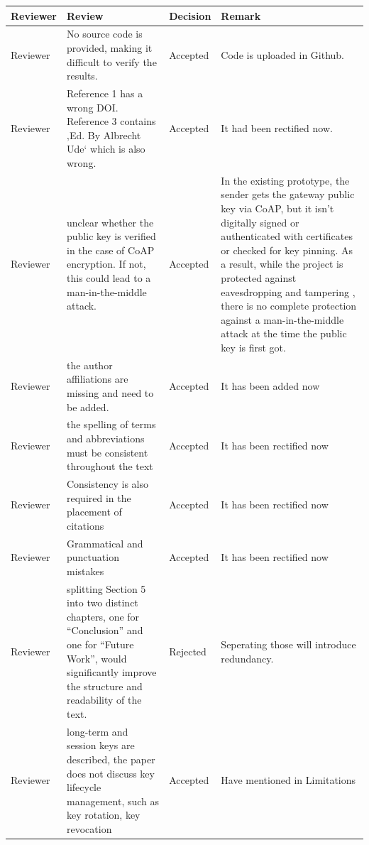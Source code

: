 \documentclass[a4paper]{scrartcl}
\begin{document}
  \begin{table}[H]
\centering
\begin{tabular}{|p{2cm}|p{5cm}|p{2cm}|p{5cm}|}
\hline
\textbf{Reviewer} & \textbf{Review} & \textbf{Decision} & \textbf{Remark} \\
\hline

Reviewer &
No source code is provided, making it difficult to verify the
results. &
Accepted &
Code is uploaded in Github.\\
\hline

Reviewer &
 Reference 1 has a wrong DOI. Reference 3 contains ‚Ed. By
Albrecht Ude‘ which is also wrong. &
Accepted &
It had been rectified now.\\
\hline

Reviewer &
 unclear whether the public
key is verified in the case of CoAP encryption. If not, this could lead to a man-in-the-middle attack.&
Accepted &
In the existing prototype, the sender gets the gateway public key via CoAP, but it isn't digitally signed or authenticated with certificates or checked for key pinning. As a result, while the project is protected against eavesdropping and tampering , there is no complete protection against a man-in-the-middle attack at the time the public key is first got.\\
\hline

Reviewer &
 the author affiliations are missing and need to be added.&
Accepted &
It has been added now\\
\hline

Reviewer &
the spelling of terms and abbreviations must be consistent throughout the text&
Accepted &
It has been rectified now\\
\hline

Reviewer &
Consistency is also required in the placement of citations &
Accepted &
It has been rectified now\\
\hline

Reviewer &
Grammatical and punctuation mistakes&
Accepted &
It has been rectified now\\
\hline

Reviewer &
splitting Section 5 into two distinct chapters, one
for “Conclusion” and one for “Future Work”, would significantly improve the structure and readability of the text.&
Rejected &
Seperating those will introduce redundancy. \\
\hline

Reviewer &
long-term and session keys are described, the paper does not
discuss key lifecycle management, such as key rotation, key
revocation &
Accepted &
Have mentioned in Limitations \\
\hline


\end{tabular}
\label{tab:review}
\end{table}
\end{document}
